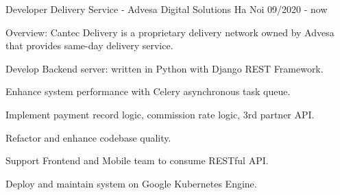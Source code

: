 \begin{cventries}
    \cventry
    {Developer} %
    {Delivery Service - Advesa Digital Solutions} %
    {Ha Noi} %
    {09/2020 - now} %
    {
        \begin{cvitems} %
            \item {Overview: Cantec Delivery is a proprietary delivery network owned by Advesa that provides same-day delivery service.}
            \item {Develop Backend server: written in Python with Django REST Framework.}
            \item {Enhance system performance with Celery asynchronous task queue.}
            \item {Implement payment record logic, commission rate logic, 3rd partner API.}
            \item {Refactor and enhance codebase quality.}
            \item {Support Frontend and Mobile team to consume RESTful API.}
            \item {Deploy and maintain system on Google Kubernetes Engine.}
        \end{cvitems}
    }

\end{cventries}
